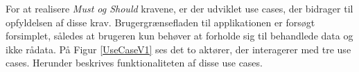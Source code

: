 %
%
%
%
%

\pagebreak
For at realisere \textit{Must og Should } kravene, er der udviklet use cases, der bidrager til opfyldelsen  af disse krav. Brugergrænsefladen til applikationen er forsøgt forsimplet, således at brugeren kun behøver at forholde sig til behandlede data og ikke rådata. På Figur \ref{UseCaseV1} ses det to aktører, der interagerer med tre use cases.  Herunder beskrives funktionaliteten af disse use cases. 


